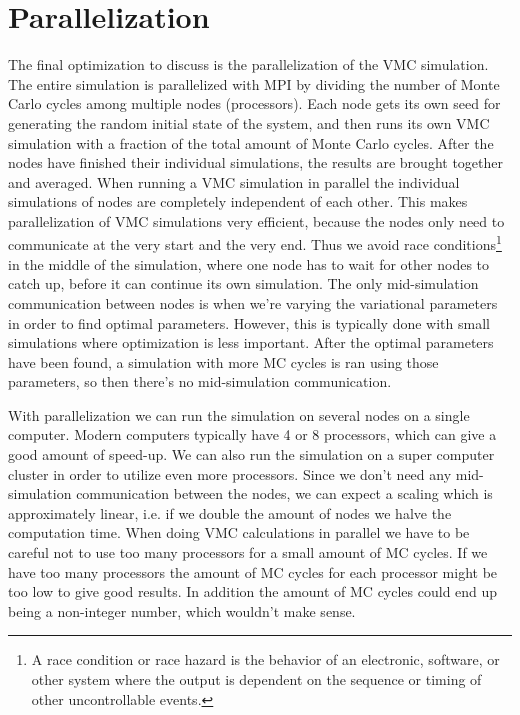 \documentclass[../main.tex]{subfiles}
\begin{document}
\section{Parallelization}\label{sec:Parallel}

The final optimization to discuss is the parallelization of the VMC simulation. The entire simulation is parallelized with MPI by dividing the number of Monte Carlo cycles among multiple nodes (processors). Each node gets its own seed for generating the random initial state of the system, and then runs its own VMC simulation with a fraction of the total amount of Monte Carlo cycles. After the nodes have finished their individual simulations, the results are brought together and averaged. When running a VMC simulation in parallel the individual simulations of nodes are completely independent of each other. This makes parallelization of VMC simulations very efficient, because the nodes only need to communicate at the very start and the very end. Thus we avoid race conditions\footnote{A race condition or race hazard is the behavior of an electronic, software, or other system where the output is dependent on the sequence or timing of other uncontrollable events.\cite{race condition}} in the middle of the simulation, where one node has to wait for other nodes to catch up, before it can continue its own simulation. The only mid-simulation communication between nodes is when we're varying the variational parameters in order to find optimal parameters. However, this is typically done with small simulations where optimization is less important. After the optimal parameters have been found, a simulation with more MC cycles is ran using those parameters, so then there's no mid-simulation communication. 

With parallelization we can run the simulation on several nodes on a single computer. Modern computers typically have 4 or 8 processors, which can give a good amount of speed-up. We can also run the simulation on a super computer cluster in order to utilize even more processors. Since we don't need any mid-simulation communication between the nodes, we can expect a scaling which is approximately linear, i.e. if we double the amount of nodes we halve the computation time. When doing VMC calculations in parallel we have to be careful not to use too many processors for a small amount of MC cycles. If we have too many processors the amount of MC cycles for each processor might be too low to give good results. In addition the amount of MC cycles could end up being a non-integer number, which wouldn't make sense.
\end{document}
